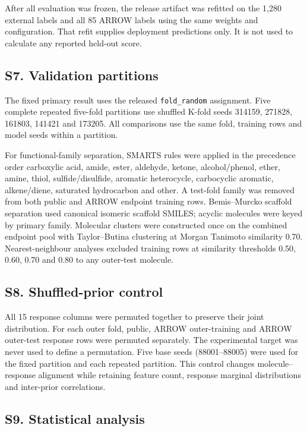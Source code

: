 \documentclass[10pt]{article}
\begin{document}
After all evaluation was frozen, the release artifact was refitted on the 1,280
external labels and all 85 ARROW labels using the same weights and configuration.
That refit supplies deployment predictions only. It is not used to calculate any
reported held-out score.

\subsection*{S7. Validation partitions}

The fixed primary result uses the released \texttt{fold\_random} assignment. Five
complete repeated five-fold partitions use shuffled K-fold seeds 314159, 271828,
161803, 141421 and 173205. All comparisons use the same fold, training rows and model
seeds within a partition.

For functional-family separation, SMARTS rules were applied in the precedence order
carboxylic acid, amide, ester, aldehyde, ketone, alcohol/phenol, ether, amine, thiol,
sulfide/disulfide, aromatic heterocycle, carbocyclic aromatic, alkene/diene,
saturated hydrocarbon and other. A test-fold family was removed from both public and
ARROW endpoint training rows. Bemis--Murcko scaffold separation used canonical
isomeric scaffold SMILES; acyclic molecules were keyed by primary family. Molecular
clusters were constructed once on the combined endpoint pool with Taylor--Butina
clustering at Morgan Tanimoto similarity 0.70. Nearest-neighbour analyses excluded
training rows at similarity thresholds 0.50, 0.60, 0.70 and 0.80 to any outer-test
molecule.

\subsection*{S8. Shuffled-prior control}

All 15 response columns were permuted together to preserve their joint distribution.
For each outer fold, public, ARROW outer-training and ARROW outer-test response rows
were permuted separately. The experimental target was never used to define a
permutation. Five base seeds (88001--88005) were used for the fixed partition and
each repeated partition. This control changes molecule--response alignment while
retaining feature count, response marginal distributions and inter-prior
correlations.

\subsection*{S9. Statistical analysis}
\end{document}
